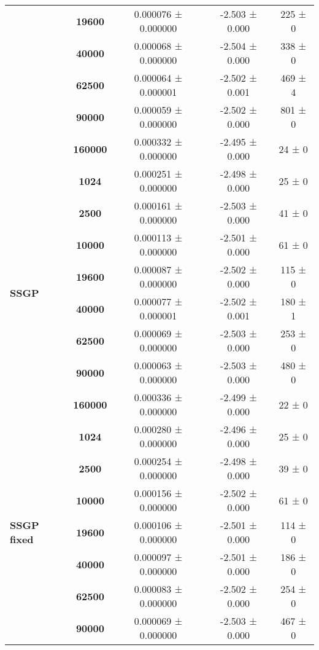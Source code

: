 \begin{tabular}{lcccc}
           & \textbf{19600 } &  0.000076 ± 0.000000 &  -2.503 ± 0.000 &    225 ± 0 \\
           & \textbf{40000 } &  0.000068 ± 0.000000 &  -2.504 ± 0.000 &    338 ± 0 \\
           & \textbf{62500 } &  0.000064 ± 0.000001 &  -2.502 ± 0.001 &    469 ± 4 \\
           & \textbf{90000 } &  0.000059 ± 0.000000 &  -2.502 ± 0.000 &    801 ± 0 \\
           & \textbf{160000} &  0.000332 ± 0.000000 &  -2.495 ± 0.000 &     24 ± 0 \\
\cline{1-5}
\multirow{8}{*}{\textbf{SSGP}} & \textbf{1024  } &  0.000251 ± 0.000000 &  -2.498 ± 0.000 &     25 ± 0 \\
           & \textbf{2500  } &  0.000161 ± 0.000000 &  -2.503 ± 0.000 &     41 ± 0 \\
           & \textbf{10000 } &  0.000113 ± 0.000000 &  -2.501 ± 0.000 &     61 ± 0 \\
           & \textbf{19600 } &  0.000087 ± 0.000000 &  -2.502 ± 0.000 &    115 ± 0 \\
           & \textbf{40000 } &  0.000077 ± 0.000001 &  -2.502 ± 0.001 &    180 ± 1 \\
           & \textbf{62500 } &  0.000069 ± 0.000000 &  -2.503 ± 0.000 &    253 ± 0 \\
           & \textbf{90000 } &  0.000063 ± 0.000000 &  -2.503 ± 0.000 &    480 ± 0 \\
           & \textbf{160000} &  0.000336 ± 0.000000 &  -2.499 ± 0.000 &     22 ± 0 \\
\cline{1-5}
\multirow{7}{*}{\textbf{SSGP fixed}} & \textbf{1024  } &  0.000280 ± 0.000000 &  -2.496 ± 0.000 &     25 ± 0 \\
           & \textbf{2500  } &  0.000254 ± 0.000000 &  -2.498 ± 0.000 &     39 ± 0 \\
           & \textbf{10000 } &  0.000156 ± 0.000000 &  -2.502 ± 0.000 &     61 ± 0 \\
           & \textbf{19600 } &  0.000106 ± 0.000000 &  -2.501 ± 0.000 &    114 ± 0 \\
           & \textbf{40000 } &  0.000097 ± 0.000000 &  -2.501 ± 0.000 &    186 ± 0 \\
           & \textbf{62500 } &  0.000083 ± 0.000000 &  -2.502 ± 0.000 &    254 ± 0 \\
           & \textbf{90000 } &  0.000069 ± 0.000000 &  -2.503 ± 0.000 &    467 ± 0 \\
\bottomrule
\end{tabular}
